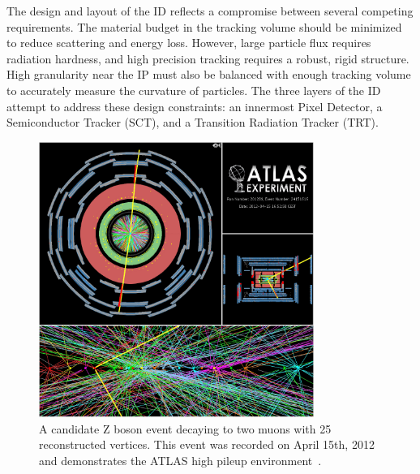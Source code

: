 The design and layout of the ID reflects a compromise between several competing requirements. The material budget in the tracking volume
should be minimized to reduce scattering and energy loss. However, 
large particle flux requires radiation hardness, and high precision tracking requires a robust, rigid structure. High granularity near the IP must also be balanced with enough tracking volume to accurately measure the curvature of particles. The three layers of the ID attempt to address these design constraints: an innermost Pixel Detector, a Semiconductor Tracker (SCT), and a Transition Radiation Tracker (TRT).  
\begin{figure}[tbp]
    \begin{center}
    \includegraphics[width=0.8\textwidth]{figures/Atlas/25ver_zmumu}
    \caption[High vertex multiplicity event]{A candidate Z boson event decaying to two muons with 25 reconstructed vertices. This event was recorded on April 15th, 2012 and demonstrates the ATLAS high pileup environment~\cite{25_vertices_z}.}
    \label{fig:25_ver_zmumu}
    \end{center}
\end{figure}


